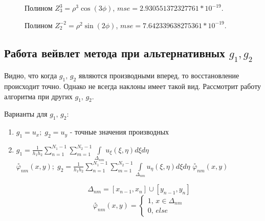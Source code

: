 \documentclass{article}
\begin{document}
\begin{figure}[H]
\caption{Полином $Z_3^{3} = \rho^3 \cos(3\phi)$, $mse = 2.930551372327761*10^{-19}$.}
\end{figure}

\begin{figure}[H]
\caption{Полином $Z_2^{-2} = \rho^2 \sin(2\phi)$, $mse = 7.642339638275361*10^{-19}$.}
\end{figure}


\subsection{Работа вейвлет метода при альтернативных $g_1, g_2$}
Видно, что когда $g_1,\, g_2$ являются производными вперед, то восстановление происходит точно. Однако не всегда наклоны имеет такой вид. Рассмотрит работу алгоритма при других $g_1,\, g_2$.

Варианты для $g_1,\,g_2:$
\begin{enumerate} 
\item $g_1 = u_x;\; g_2 = u_y$ - точные значения производных
\item $g_1 = \frac{1}{h_1h_2} \sum \limits_{n=1}^{N_1 - 1} \sum \limits_{m=1}^{N_2 - 1} \int \limits _{\Delta_{nm}} u_\xi(\xi,\eta) d\xi d\eta$ $\overset{\circ}{\varphi}_{nm}(x,y);\;g_2 = \frac{1}{h_1h_2} \sum \limits_{n=1}^{N_1 - 1} \sum \limits_{m=1}^{N_2 - 1} \int \limits _{\Delta_{nm}} u_\eta(\xi,\eta) d\xi d\eta$ $\overset{\circ}{\varphi}_{nm}(x,y)$ 

$$\Delta_{nm} = [x_{n-1}, x_n] \cup [y_{n-1}, y_n] $$
$$\overset{\circ}{\varphi}_{nm}(x,y) = \begin{cases} 1, \, x \in \Delta_{nm} \\ 0, \, else\end{cases}$$

\end{enumerate}
\end{document}
